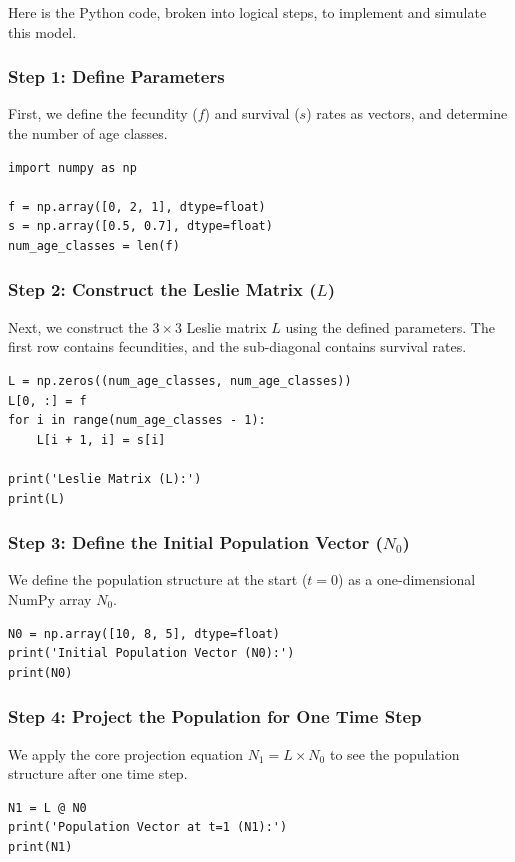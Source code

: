 \documentclass{article}
\begin{document}
Here is the Python code, broken into logical steps, to implement and simulate this model.

\subsubsection{Step 1: Define Parameters}
First, we define the fecundity ($f$) and survival ($s$) rates as vectors, and determine the number of age classes.
\begin{lstlisting}[caption={Define demographic parameters}]
import numpy as np

f = np.array([0, 2, 1], dtype=float)
s = np.array([0.5, 0.7], dtype=float)
num_age_classes = len(f)
\end{lstlisting}

\subsubsection{Step 2: Construct the Leslie Matrix ($L$)}
Next, we construct the $3 \times 3$ Leslie matrix $L$ using the defined parameters. The first row contains fecundities, and the sub-diagonal contains survival rates.
\begin{lstlisting}[caption={Construct the Leslie Matrix}]
L = np.zeros((num_age_classes, num_age_classes))
L[0, :] = f
for i in range(num_age_classes - 1):
    L[i + 1, i] = s[i]

print('Leslie Matrix (L):')
print(L)
\end{lstlisting}

\subsubsection{Step 3: Define the Initial Population Vector ($N_0$)}
We define the population structure at the start ($t=0$) as a one-dimensional NumPy array $N_0$.
\begin{lstlisting}[caption={Define the initial population}]
N0 = np.array([10, 8, 5], dtype=float)
print('Initial Population Vector (N0):')
print(N0)
\end{lstlisting}

\subsubsection{Step 4: Project the Population for One Time Step}
We apply the core projection equation $N_1 = L \times N_0$ to see the population structure after one time step.
\begin{lstlisting}[caption={Project population one step ahead}]
N1 = L @ N0
print('Population Vector at t=1 (N1):')
print(N1)
\end{lstlisting}
\end{document}
